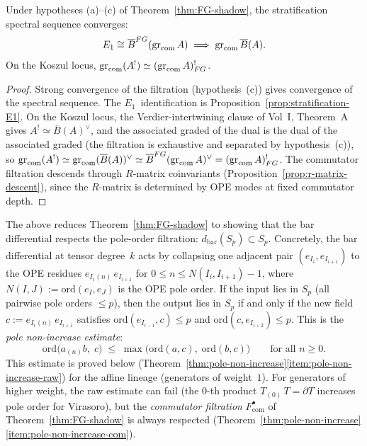 \begin{corollary}[\ClaimStatusProvedHere]
\label{cor:FG-shadow-convergence}
Under hypotheses \textup{(a)--(c)} of
Theorem~\textup{\ref{thm:FG-shadow}}, the stratification spectral
sequence converges:
\[
E_1\cong \overline{B}^{FG}(\operatorname{gr}_{\mathrm{com}}A)
\;\Longrightarrow\;
\operatorname{gr}_{\mathrm{com}}\overline{B}(A).
\]
On the Koszul locus,
$\operatorname{gr}_{\mathrm{com}}(A^!)\simeq(\operatorname{gr}_{\mathrm{com}}A)^!_{FG}$.
\end{corollary}

\begin{proof}
Strong convergence of the filtration (hypothesis~(c)) gives convergence of
the spectral sequence. The $E_1$~identification is
Proposition~\ref{prop:stratification-E1}. On the Koszul locus, the
Verdier-intertwining clause of Vol~I, Theorem~A gives
$A^!\simeq\overline{B}(A)^\vee$,
and the associated graded of the dual is the dual of the associated graded
(the filtration is exhaustive and separated by hypothesis~(c)), so
$\operatorname{gr}_{\mathrm{com}}(A^!)\simeq\operatorname{gr}_{\mathrm{com}}(\overline{B}(A))^\vee
\simeq\overline{B}^{FG}(\operatorname{gr}_{\mathrm{com}}A)^\vee
=(\operatorname{gr}_{\mathrm{com}}A)^!_{FG}$.
The commutator filtration descends through $R$-matrix coinvariants
(Proposition~\ref{prop:r-matrix-descent}), since the $R$-matrix is
determined by OPE modes at fixed commutator depth.
\end{proof}

\begin{remark}
\label{rem:bar-pole-compatibility}
The above reduces Theorem~\ref{thm:FG-shadow} to showing that the bar
differential respects the pole-order filtration: $d_{\mathrm{bar}}(S_p)\subset
S_p$. Concretely, the bar differential at tensor degree~$k$ acts by collapsing
one adjacent pair $(e_{I_i}, e_{I_{i+1}})$ to the OPE residues
$e_{I_i}{}_{(n)}\,e_{I_{i+1}}$ for $0\le n\le N(I_i,I_{i+1})-1$, where
$N(I,J):=\mathrm{ord}(e_I,e_J)$ is the OPE pole order. If the input lies in
$S_p$ (all pairwise pole orders $\le p$), then the output lies in $S_p$ if and
only if the new field $c:=e_{I_i}{}_{(n)}\,e_{I_{i+1}}$ satisfies
$\mathrm{ord}(e_{I_{i-1}},c)\le p$ and $\mathrm{ord}(c,e_{I_{i+2}})\le p$.
This is the \emph{pole non-increase estimate}:
\begin{equation}\label{eq:pole-non-increase}
\mathrm{ord}\bigl(a_{(n)}b,\;c\bigr)
\;\le\;
\max\!\bigl(\mathrm{ord}(a,c),\;\mathrm{ord}(b,c)\bigr)
\qquad\text{for all }n\ge 0.
\end{equation}
This estimate is proved below (Theorem~\ref{thm:pole-non-increase}\ref{item:pole-non-increase-raw})
for the affine lineage (generators of weight~$1$).
For generators of higher weight, the raw estimate can fail (the $0$-th product
$T_{(0)}\,T=\partial T$ increases pole order for Virasoro), but the
\emph{commutator filtration} $F_{\mathrm{com}}^\bullet$ of
Theorem~\ref{thm:FG-shadow} is always respected
(Theorem~\ref{thm:pole-non-increase}\ref{item:pole-non-increase-com}).
\end{remark}

